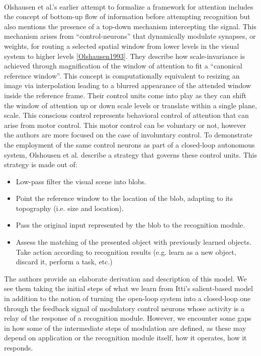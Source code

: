 \documentclass{report}
\begin{document}
\paragraph{}Olshausen et al.'s earlier attempt to formalize a framework for attention includes the concept of bottom-up flow of information before attempting recognition but also mentions the presence of a top-down mechanism intercepting the signal. This mechanism arises from "`control-neurons"' that dynamically modulate synapses, or weights, for routing a selected spatial window from lower levels in the visual system to higher levels \cref{Olshausen1993}. They describe how scale-invariance is achieved through magnification of the window of attention to fit a "`canonical reference window"'. This concept is computationally equivalent to resizing an image via interpolation leading to a blurred appearance of the attended window inside the reference frame. Their control units come into play as they can shift the window of attention up or down scale levels or translate within a single plane, scale. This conscious control represents behavioral control of attention that can arise from motor control. This motor control can be voluntary or not, however the authors are more focused on the case of involuntary control. To demonstrate the employment of the same control neurons as part of a closed-loop autonomous system, Olshousen et al. describe a strategy that governs these control units.
This strategy is made out of:
\begin{itemize}
  \item Low-pass filter the visual scene into blobs.
  \item Point the reference window to the location of the blob, adapting to its topography (i.e. size and location).
  \item Pass the original input represented by the blob to the recognition module.
  \item Assess the matching of the presented object with previously learned objects. Take action according to recognition results (e.g. learn as a new object, discard it, perform a task, etc.) \cite{Olshausen1993}
\end{itemize}
The authors provide an elaborate derivation and description of this model. We see them taking the initial steps of what we learn from Itti's salient-based model in addition to the notion of turning the open-loop system into a closed-loop one through the feedback signal of modulatory control neurons whose activity is a relay of the response of a recognition module. However, we encounter some gaps in how some of the intermediate steps of modulation are defined, as these may depend on application or the recognition module itself, how it operates, how it responds. 
\end{document}
